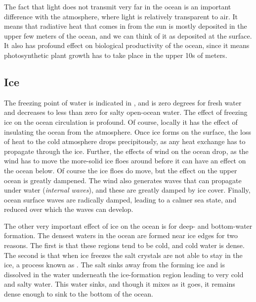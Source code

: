 The fact that light does not transmit very far in the ocean is an important difference with the atmosphere, where light is relatively transparent to air.  It means that radiative heat that comes in from the sun is mostly deposited in the upper few meters of the ocean, and we can think of it as deposited at the surface.  It also has profound effect on biological productivity of the ocean, since it means photosynthetic plant growth has to take place in the upper 10s of meters.  

\subsection{Ice}

The freezing point of water is indicated in , and is zero degrees for fresh water and decreases to less than zero for salty open-ocean water.  The effect of freezing ice on the ocean circulation is profound. Of course, locally it has the effect of insulating the ocean from the atmosphere.  Once ice forms on the surface, the loss of heat to the cold atmosphere drops precipitously, as any heat exchange has to propagate through the ice.  Further, the effects of wind on the ocean drop, as the wind has to move the more-solid ice floes around before it can have an effect on the ocean below.  Of course the ice floes do move, but the effect on the upper ocean is greatly dampened.  The wind also generates waves that can propagate under water (\emph{internal waves}), and these are greatly damped by ice cover.  Finally, ocean surface waves are radically damped, leading to a calmer sea state, and reduced  over which the waves can develop. 

The other very important effect of ice on the ocean is for deep- and bottom-water formation.  The densest waters in the ocean are formed near ice edges for two reasons.  The first is that these regions tend to be cold, and cold water is dense.  The second is that when ice freezes the salt crystals are not able to stay in the ice, a process known as . The salt sinks away from the forming ice and is dissolved in the water underneath the ice-formation region leading to very cold and salty water.  This water sinks, and though it mixes as it goes, it remains dense enough to sink to the bottom of the ocean.  

